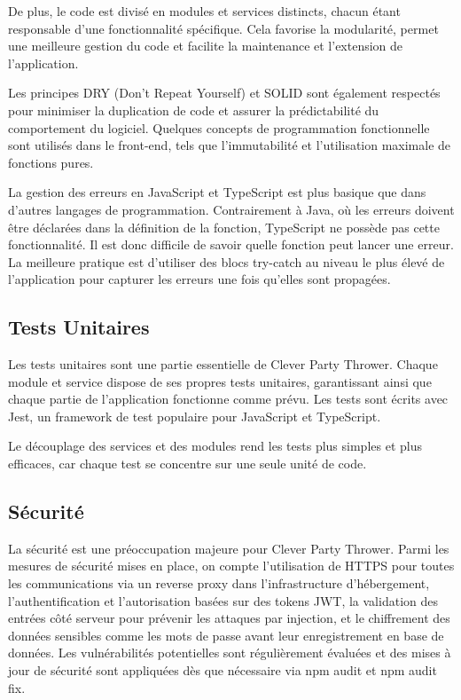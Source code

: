 De plus, le code est divisé en modules et services distincts, chacun étant responsable d'une fonctionnalité spécifique.
Cela favorise la modularité, permet une meilleure gestion du code et facilite la maintenance et l'extension de l'application.

Les principes DRY (Don't Repeat Yourself) et SOLID sont également respectés pour minimiser la duplication de code et assurer la prédictabilité du comportement du logiciel.
Quelques concepts de programmation fonctionnelle sont utilisés dans le front-end, tels que l'immutabilité et l'utilisation maximale de fonctions pures.

La gestion des erreurs en JavaScript et TypeScript est plus basique que dans d'autres langages de programmation.
Contrairement à Java, où les erreurs doivent être déclarées dans la définition de la fonction, TypeScript ne possède pas cette fonctionnalité.
Il est donc difficile de savoir quelle fonction peut lancer une erreur.
La meilleure pratique est d'utiliser des blocs try-catch au niveau le plus élevé de l'application pour capturer les erreurs une fois qu'elles sont propagées.

\subsection{Tests Unitaires}\label{subsec:tests-unitaires}
Les tests unitaires sont une partie essentielle de Clever Party Thrower.
Chaque module et service dispose de ses propres tests unitaires, garantissant ainsi que chaque partie de l'application fonctionne comme prévu.
Les tests sont écrits avec Jest, un framework de test populaire pour JavaScript et TypeScript.

Le découplage des services et des modules rend les tests plus simples et plus efficaces, car chaque test se concentre sur une seule unité de code.

\subsection{Sécurité}\label{subsec:securite}
La sécurité est une préoccupation majeure pour Clever Party Thrower.
Parmi les mesures de sécurité mises en place, on compte l'utilisation de HTTPS pour toutes les communications via un reverse proxy dans l'infrastructure d'hébergement,
l'authentification et l'autorisation basées sur des tokens JWT, la validation des entrées côté serveur pour prévenir les attaques par injection,
et le chiffrement des données sensibles comme les mots de passe avant leur enregistrement en base de données.
Les vulnérabilités potentielles sont régulièrement évaluées et des mises à jour de sécurité sont appliquées dès que nécessaire via npm audit et npm audit fix.